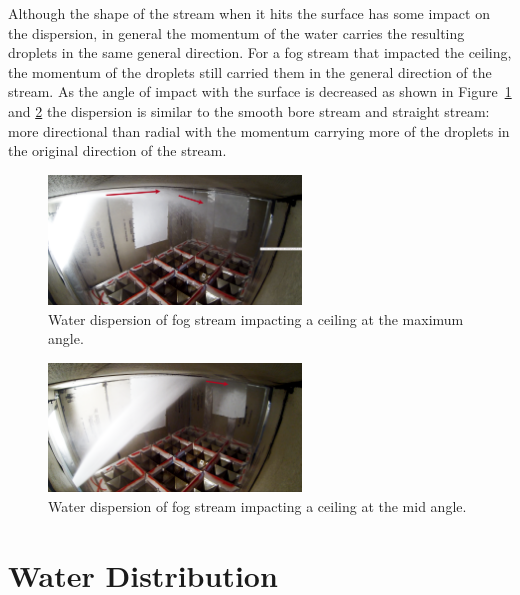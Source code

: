 \documentclass[12pt,oneside]{book}
\begin{document}
Although the shape of the stream when it hits the surface has some impact on the dispersion, in general the momentum of the water carries the resulting droplets in the same general direction. For a fog stream that impacted the ceiling, the momentum of the droplets still carried them in the general direction of the stream. As the angle of impact with the surface is decreased as shown in Figure~\ref{fig:MaxAngleCeilingFogImpact} and \ref{fig:MinAngleCeilingFogImpact} the dispersion is similar to the smooth bore stream and straight stream: more directional than radial with the momentum carrying more of the droplets in the original direction of the stream.

\begin{figure}[!ht]
\centering
\includegraphics[width=0.6\textwidth]{Figures/Water_Distribution/Nozzle_Directions/Interior_MaxAngleCeiling_Fog_Arrows}
\caption[Water Dispersion Fog Stream Maximum Angle Ceiling]{Water dispersion of fog stream impacting a ceiling at the maximum angle.}
\label{fig:MaxAngleCeilingFogImpact}
\end{figure}

\begin{figure}[!ht]
\centering
\includegraphics[width=0.6\textwidth]{Figures/Water_Distribution/Nozzle_Directions/Interior_MidCeiling_Fog_Arrows} 
\caption[Water Dispersion Fog Stream Mid Angle Ceiling]{Water dispersion of fog stream impacting a ceiling at the mid angle.}
\label{fig:MinAngleCeilingFogImpact}
\end{figure}


\section{Water Distribution}
\label{sec:water_dist}
\end{document}
